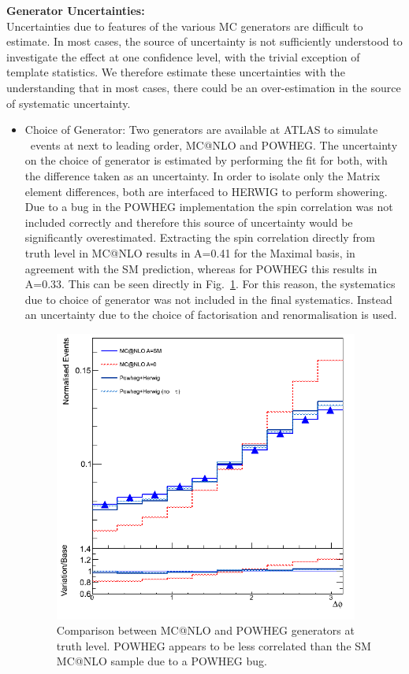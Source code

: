 \vspace{5mm} 
\noindent
\textbf{Generator Uncertainties:}\\
 Uncertainties due to features of the various MC generators are difficult to estimate. In most cases, the source of uncertainty is not sufficiently understood to investigate the effect at one confidence level, with the trivial exception of template statistics. We therefore estimate these uncertainties with the understanding that in most cases, there could be an over-estimation in the source of systematic uncertainty.%
 
\begin{itemize}
    \item Choice of Generator: Two generators are available at ATLAS to simulate \ttbar\ events at next to leading order, MC@NLO and POWHEG. The uncertainty on the choice of generator is estimated by performing the fit for both, with the difference taken as an uncertainty. In order to isolate only the Matrix element differences, both are interfaced to HERWIG to perform showering. Due to a bug in the POWHEG implementation the spin correlation was not included correctly and therefore this source of uncertainty would be significantly overestimated. Extracting the spin correlation directly from truth level in MC@NLO results in A=0.41 for the Maximal basis, in agreement with the SM prediction, whereas for POWHEG this results in A=0.33. This can be seen directly in Fig.~\ref{fig:generator_comparison}. For this reason, the systematics due to choice of generator was not included in the final systematics. Instead an uncertainty due to the choice of factorisation and renormalisation is used.

\begin{figure}[h]
	\begin{center}
	\includegraphics[width = 100mm]{f/truth_delta_Phi10generator_comparison}
	\end{center}
        \caption{Comparison between MC@NLO and POWHEG generators at truth level. POWHEG appears to be less correlated than the SM MC@NLO sample due to a POWHEG bug.}
        \label{fig:generator_comparison}
\end{figure}


\end{itemize}
